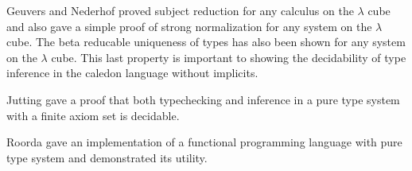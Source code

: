 Geuvers and Nederhof \citep{geuvers1991modular} proved subject reduction for any calculus on the $\lambda$ cube 
and also gave a simple proof of strong normalization for any system on the $\lambda$ cube.  
The beta reducable uniqueness of types has also been shown for any system on the $\lambda$ cube.  
This last property is important to showing the decidability of type inference in 
the caledon language without implicits.

Jutting \citep{jutting1993typing} gave a proof that both typechecking and inference
in a pure type system with a finite axiom set is decidable.

Roorda \citep{roorda2001pure} gave an implementation of a functional programming language with 
pure type system and demonstrated its utility.

